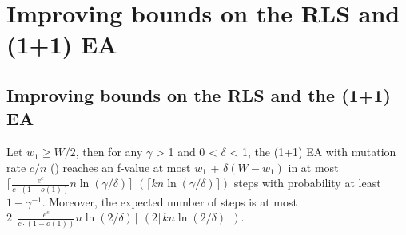 \chapter{Improving bounds on the RLS and (1+1) EA}\label{ch:Content1}

\section{Improving bounds on the RLS and the (1+1) EA}

\begin{lemma}\label{lemma:CWittRefined}
    Let $w_1\ge W/2$, then for any $\gamma$ > 1 and 0 < $\delta$ < 1, the (1+1) EA with mutation rate $c/n$ (\RLSR[k]) reaches an f-value at most $w_1$ + $\delta(W-w_1)$ in at most $\lceil\frac{e^c}{c\cdot(1-o(1))}n\ln(\gamma/\delta)\rceil$ $(\lceil kn\ln(\gamma/\delta)\rceil)$ steps with probability at least $1-\gamma^{-1}$. Moreover, the expected number of steps is at most $2\lceil\frac{e^c}{c\cdot(1-o(1))}n\ln(2/\delta)\rceil$ $(2\lceil kn\ln(2/\delta)\rceil)$.
\end{lemma}

